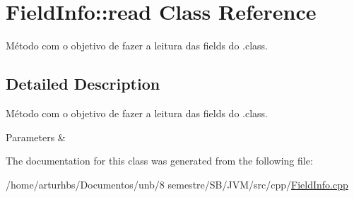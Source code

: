 \hypertarget{classFieldInfo_1_1read}{}\section{Field\+Info\+:\+:read Class Reference}
\label{classFieldInfo_1_1read}


Método com o objetivo de fazer a leitura das fields do .class.  




\subsection{Detailed Description}
Método com o objetivo de fazer a leitura das fields do .class. 


\begin{DoxyParams}{Parameters}
{\em } & \\
\hline
\end{DoxyParams}


The documentation for this class was generated from the following file\+:\begin{DoxyCompactItemize}
\item 
/home/arturhbs/\+Documentos/unb/8 semestre/\+S\+B/\+J\+V\+M/src/cpp/\hyperlink{FieldInfo_8cpp}{Field\+Info.\+cpp}\end{DoxyCompactItemize}
